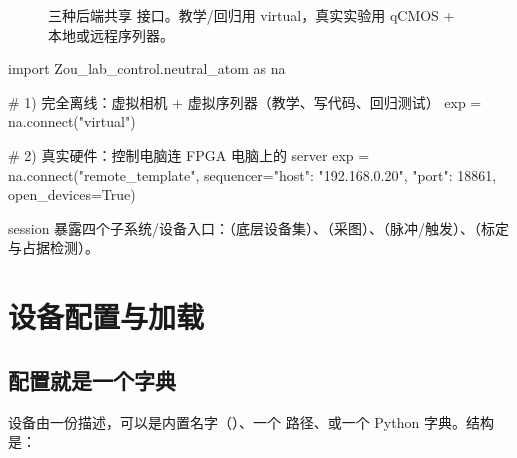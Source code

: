 \documentclass[11pt,oneside,openany]{book}
\begin{document}
\begin{figure}[htbp]
  \centering
  \caption{三种后端共享  接口。教学/回归用 virtual，真实实验用 qCMOS + 本地或远程序列器。}
  \label{fig:dev-backends}
\end{figure}

\begin{codeblock}[Python]
import Zou_lab_control.neutral_atom as na

# 1) 完全离线：虚拟相机 + 虚拟序列器（教学、写代码、回归测试）
exp = na.connect("virtual")

# 2) 真实硬件：控制电脑连 FPGA 电脑上的 server
exp = na.connect("remote_template",
                 sequencer={"host": "192.168.0.20", "port": 18861},
                 open_devices=True)
\end{codeblock}

session 暴露四个子系统/设备入口：（底层设备集）、（采图）、（脉冲/触发）、（标定与占据检测）。

\chapter{设备配置与加载}

\section{配置就是一个字典}
设备由一份描述，可以是内置名字（）、一个  路径、或一个 Python 字典。结构是：
\end{document}
